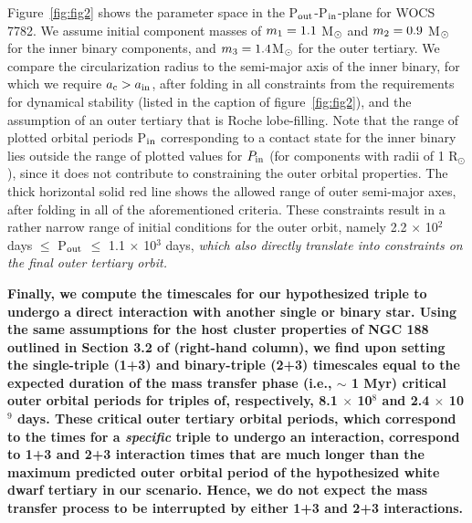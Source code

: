 \documentclass[twocolumn]{aastex62}
\def\simon#1{{\bf {\color{red}[#1 -- Simon]}}}
\begin{document}
Figure~\ref{fig:fig2} shows the parameter space in the P$_{\rm
  out}$-P$_{\rm in}$-plane for WOCS 7782.  We assume initial
component masses of $m_{\rm 1} = 1.1$ M$_{\rm \odot}$ and $m_{\rm 2} =
0.9$ M$_{\rm \odot}$ for the inner binary components, and $m_{\rm 3} =
1.4 $M$_{\rm \odot}$ for the outer tertiary.  We compare the
circularization radius to the semi-major axis of the inner binary, for
which we require $a_{\rm c} > a_{\rm in}$, after folding in all
constraints from the requirements for dynamical stability (listed in
the caption of figure~\ref{fig:fig2}), and the assumption of an outer tertiary that is Roche
lobe-filling.  
Note that the range of
plotted orbital periods P$_{\rm in}$ corresponding to a contact state
for the inner binary lies outside the range of plotted values for
$P_{\rm in}$ (for components with radii of 1 R$_{\odot}$),
since it does not contribute to constraining the outer orbital
properties.  The thick horizontal solid red line shows the allowed
range of outer semi-major axes, after folding in all of 
the aforementioned criteria.  These constraints result in a rather narrow
range of initial conditions for the outer orbit, namely 2.2 $\times$
10$^{2}$ days $\le$ P$_{\rm out}$ $\le$ 1.1 $\times$ 10$^3$ days, \textit{which also directly translate into constraints on the final outer tertiary orbit.}

\textbf{Finally, we compute the timescales for our hypothesized triple to undergo a direct interaction with another single or binary star.  Using the same assumptions for the host cluster properties of NGC 188 outlined in Section 3.2 of \citet{leigh11} (right-hand column), we find upon setting the single-triple (1+3) and binary-triple (2+3) timescales equal to the expected duration of the mass transfer phase (i.e., $\sim$ 1 Myr) critical outer orbital periods for triples of, respectively, 8.1 $\times$ 10$^8$ and 2.4 $\times$ 10$^9$ days.  These critical outer tertiary orbital periods, which correspond to the times for a \textit{specific} triple to undergo an interaction, correspond to 1+3 and 2+3 interaction times that are much longer than the maximum predicted outer orbital period of the hypothesized white dwarf tertiary in our scenario.  Hence, we do not expect the mass transfer process to be interrupted by either 1+3 and 2+3 interactions.}
\end{document}
